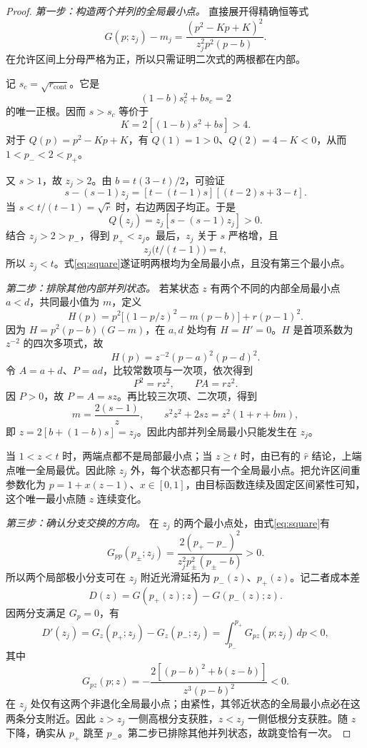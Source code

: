 \documentclass[11pt,a4paper]{ctexart}
\newcommand{\rcont}{r_{\mathrm{cont}}}
\begin{document}
\begin{proof}
\emph{第一步：构造两个并列的全局最小点。}
直接展开得精确恒等式
\begin{equation}
 \boxed{
 G(p;z_j)-m_j
 =\frac{(p^2-Kp+K)^2}{z_j^2p^2(p-b)}.}
 \label{eq:square}
\end{equation}
在允许区间上分母严格为正，所以只需证明二次式的两根都在内部。

记 $s_c=\sqrt{\rcont}$。它是
\[
 (1-b)s_c^2+bs_c=2
\]
的唯一正根。因而 $s>s_c$ 等价于
\[
 K=2[(1-b)s^2+bs]>4.
\]
对于 $Q(p)=p^2-Kp+K$，有 $Q(1)=1>0$、$Q(2)=4-K<0$，从而 $1<p_-<2<p_+$。

又 $s>1$，故 $z_j>2$。由 $b=t(3-t)/2$，可验证
\begin{equation}
 s-(s-1)z_j
 =[t-(t-1)s][(t-2)s+3-t].
 \label{eq:feasible-factor}
\end{equation}
当 $s<t/(t-1)=\sqrt{\hat r}$ 时，右边两因子均正。于是
\[
 Q(z_j)=z_j[s-(s-1)z_j]>0.
\]
结合 $z_j>2>p_-$，得到 $p_+<z_j$。最后，$z_j$ 关于 $s$ 严格增，且
\[
 z_j\bigl(t/(t-1)\bigr)=t,
\]
所以 $z_j<t$。式\eqref{eq:square}遂证明两根均为全局最小点，且没有第三个最小点。

\emph{第二步：排除其他内部并列状态。}
若某状态 $z$ 有两个不同的内部全局最小点 $a<d$，共同最小值为 $m$，定义
\begin{equation}
 H(p)=p^2\bigl[(1-p/z)^2-m(p-b)\bigr]+r(p-1)^2.
 \label{eq:H}
\end{equation}
因为 $H=p^2(p-b)(G-m)$，在 $a,d$ 处均有 $H=H'=0$。$H$ 是首项系数为 $z^{-2}$ 的四次多项式，故
\[
 H(p)=z^{-2}(p-a)^2(p-d)^2.
\]
令 $A=a+d$、$P=ad$，比较常数项与一次项，依次得到
\[
 P^2=rz^2,\qquad PA=rz^2.
\]
因 $P>0$，故 $P=A=sz$。再比较三次项、二次项，得到
\[
 m=\frac{2(s-1)}z,\qquad
 s^2z^2+2sz=z^2(1+r+bm),
\]
即 $z=2[b+(1-b)s]=z_j$。因此内部并列全局最小只能发生在 $z_j$。

当 $1<z<t$ 时，两端点都不是局部最小点；当 $z\ge t$ 时，由已有的 $\hat r$ 结论，上端点唯一全局最优。因此除 $z_j$ 外，每个状态都只有一个全局最小点。把允许区间重参数化为 $p=1+x(z-1)$、$x\in[0,1]$，由目标函数连续及固定区间紧性可知，这个唯一最小点随 $z$ 连续变化。

\emph{第三步：确认分支交换的方向。}
在 $z_j$ 的两个最小点处，由式\eqref{eq:square}有
\[
 G_{pp}(p_\pm;z_j)
 =\frac{2(p_+-p_-)^2}{z_j^2p_\pm^2(p_\pm-b)}>0.
\]
所以两个局部极小分支可在 $z_j$ 附近光滑延拓为 $p_-(z)$、$p_+(z)$。记二者成本差
\[
 D(z)=G(p_+(z);z)-G(p_-(z);z).
\]
因两分支满足 $G_p=0$，有
\[
 D'(z_j)=G_z(p_+;z_j)-G_z(p_-;z_j)
 =\int_{p_-}^{p_+}G_{pz}(p;z_j)\,dp<0,
\]
其中
\begin{equation}
 G_{pz}(p;z)
 =-\frac{2[(p-b)^2+b(z-b)]}{z^3(p-b)^2}<0.
 \label{eq:cross}
\end{equation}
在 $z_j$ 处仅有这两个非退化全局最小点；由紧性，其邻近状态的全局最小点必在这两条分支附近。因此 $z>z_j$ 一侧高根分支获胜，$z<z_j$ 一侧低根分支获胜。随 $z$ 下降，确实从 $p_+$ 跳至 $p_-$。第二步已排除其他并列状态，故跳变恰有一次。
\end{proof}
\end{document}
